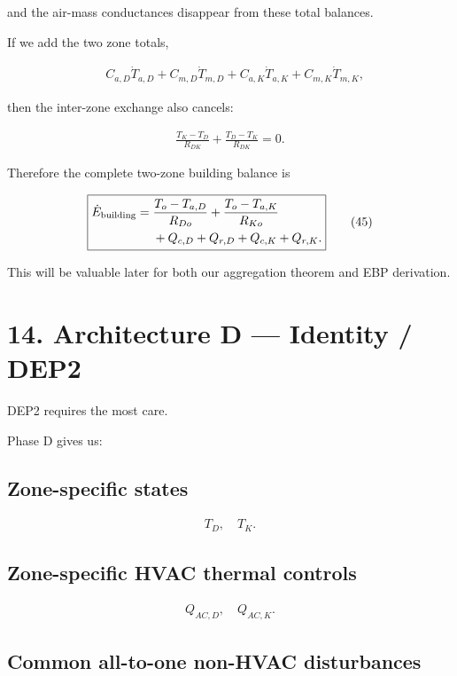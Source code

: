 \documentclass[11pt]{article}
\begin{document}
and the air-mass conductances disappear from these total balances.

If we add the two zone totals,

\begin{align}
&C_{a,D}\dot T_{a,D}
+C_{m,D}\dot T_{m,D}
+
C_{a,K}\dot T_{a,K}
+C_{m,K}\dot T_{m,K},
\end{align}

then the inter-zone exchange also cancels:

\begin{align}
\frac{T_K-T_D}{R_{DK}}
+
\frac{T_D-T_K}{R_{DK}}
=0.
\end{align}

Therefore the complete two-zone building balance is

\begin{align}
\boxed{
\begin{aligned}
\dot E_{\rm building}
={}&
\frac{T_o-T_{a,D}}{R_{Do}}
+
\frac{T_o-T_{a,K}}{R_{Ko}}\\
&+
Q_{c,D}+Q_{r,D}
+
Q_{c,K}+Q_{r,K}.
\end{aligned}
}
\tag{45}
\end{align}

This will be valuable later for both our aggregation theorem and EBP derivation.

\section*{14. Architecture D --- Identity / DEP2}

DEP2 requires the most care.

Phase D gives us:

\subsection*{Zone-specific states}

\begin{align}
T_D,\quad T_K.
\end{align}

\subsection*{Zone-specific HVAC thermal controls}

\begin{align}
Q_{AC,D},
\quad
Q_{AC,K}.
\end{align}

\subsection*{Common all-to-one non-HVAC disturbances}
\end{document}
